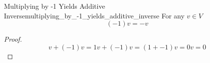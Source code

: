 \begin{proposition}{Multiplying by -1 Yields Additive
Inverse}{multiplying_by_-1_yields_additive_inverse}
For any \( v \in  V \) 
\[
\left( - 1 \right) v =  - v
\]
\end{proposition}
\begin{proof}
    \[
    v +  \left( - 1 \right) v =  1 v +  \left( - 1 \right) v =  \left( 1 +  - 1
    \right) v =  0v = 0
    \]
\end{proof}

